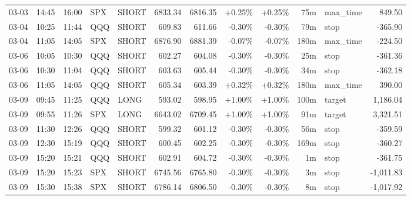 \documentclass[11pt,a4paper,twoside]{article}
\begin{document}
\begin{center}
\begin{longtable}{>{\color{txtmain}}l l l l l r r r r r >{\color{txtmain}}l r}
03-03 & 14:45 & 16:00 & SPX & SHORT & 6833.34 & 6816.35 & \textcolor{wingreen}{+0.25\%} & \textcolor{wingreen}{+0.25\%} & 75m & max\_time & \textcolor{wingreen}{849.50} \\
03-04 & 10:25 & 11:44 & QQQ & SHORT & 609.83 & 611.66 & \textcolor{lossred}{-0.30\%} & \textcolor{lossred}{-0.30\%} & 79m & stop & \textcolor{lossred}{-365.90} \\
03-04 & 11:05 & 14:05 & SPX & SHORT & 6876.90 & 6881.39 & \textcolor{lossred}{-0.07\%} & \textcolor{lossred}{-0.07\%} & 180m & max\_time & \textcolor{lossred}{-224.50} \\
03-06 & 10:05 & 10:30 & QQQ & SHORT & 602.27 & 604.08 & \textcolor{lossred}{-0.30\%} & \textcolor{lossred}{-0.30\%} & 25m & stop & \textcolor{lossred}{-361.36} \\
03-06 & 10:30 & 11:04 & QQQ & SHORT & 603.63 & 605.44 & \textcolor{lossred}{-0.30\%} & \textcolor{lossred}{-0.30\%} & 34m & stop & \textcolor{lossred}{-362.18} \\
03-06 & 11:05 & 14:05 & QQQ & SHORT & 605.34 & 603.39 & \textcolor{wingreen}{+0.32\%} & \textcolor{wingreen}{+0.32\%} & 180m & max\_time & \textcolor{wingreen}{390.00} \\
03-09 & 09:45 & 11:25 & QQQ & LONG & 593.02 & 598.95 & \textcolor{wingreen}{+1.00\%} & \textcolor{wingreen}{+1.00\%} & 100m & target & \textcolor{wingreen}{1,186.04} \\
03-09 & 09:55 & 11:26 & SPX & LONG & 6643.02 & 6709.45 & \textcolor{wingreen}{+1.00\%} & \textcolor{wingreen}{+1.00\%} & 91m & target & \textcolor{wingreen}{3,321.51} \\
03-09 & 11:30 & 12:26 & QQQ & SHORT & 599.32 & 601.12 & \textcolor{lossred}{-0.30\%} & \textcolor{lossred}{-0.30\%} & 56m & stop & \textcolor{lossred}{-359.59} \\
03-09 & 12:30 & 15:19 & QQQ & SHORT & 600.45 & 602.25 & \textcolor{lossred}{-0.30\%} & \textcolor{lossred}{-0.30\%} & 169m & stop & \textcolor{lossred}{-360.27} \\
03-09 & 15:20 & 15:21 & QQQ & SHORT & 602.91 & 604.72 & \textcolor{lossred}{-0.30\%} & \textcolor{lossred}{-0.30\%} & 1m & stop & \textcolor{lossred}{-361.75} \\
03-09 & 15:20 & 15:23 & SPX & SHORT & 6745.56 & 6765.80 & \textcolor{lossred}{-0.30\%} & \textcolor{lossred}{-0.30\%} & 3m & stop & \textcolor{lossred}{-1,011.83} \\
03-09 & 15:30 & 15:38 & SPX & SHORT & 6786.14 & 6806.50 & \textcolor{lossred}{-0.30\%} & \textcolor{lossred}{-0.30\%} & 8m & stop & \textcolor{lossred}{-1,017.92} \\

\end{longtable}
\end{center}
\end{document}
